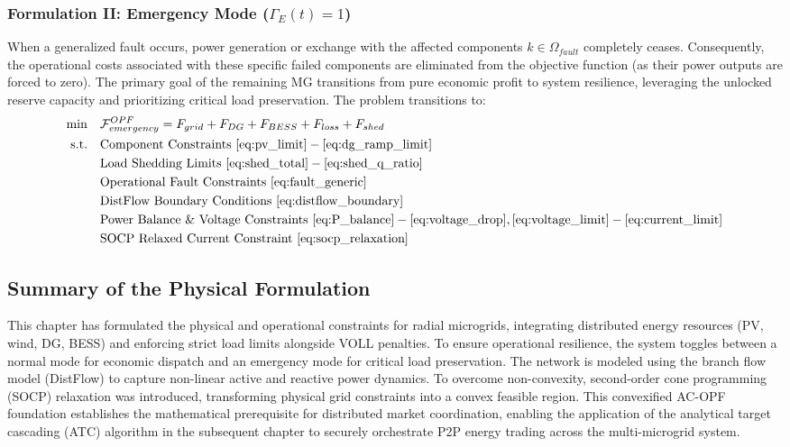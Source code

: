 \subsubsection{Formulation II: Emergency Mode ($\Gamma_E(t) = 1$)}
When a generalized fault occurs, power generation or exchange with the affected components $k \in \Omega_{fault}$ completely ceases. Consequently, the operational costs associated with these specific failed components are eliminated from the objective function (as their power outputs are forced to zero). The primary goal of the remaining MG transitions from pure economic profit to system resilience, leveraging the unlocked reserve capacity and prioritizing critical load preservation. The problem transitions to:
\begin{equation}
\begin{aligned}
    \min \quad & \mathcal{F}_{emergency}^{OPF} = F_{grid} + F_{DG} + F_{BESS} + F_{loss} + F_{shed} \\
    \text{s.t.} \quad & \text{Component Constraints } \eqref{eq:pv_limit}-\eqref{eq:dg_ramp_limit} \\
    & \text{Load Shedding Limits } \eqref{eq:shed_total}-\eqref{eq:shed_q_ratio} \\
    & \text{Operational Fault Constraints } \eqref{eq:fault_generic} \\
    & \text{DistFlow Boundary Conditions } \eqref{eq:distflow_boundary} \\
    & \text{Power Balance \& Voltage Constraints } \eqref{eq:P_balance}-\eqref{eq:voltage_drop}, \eqref{eq:voltage_limit}-\eqref{eq:current_limit} \\
    & \text{SOCP Relaxed Current Constraint } \eqref{eq:socp_relaxation}
\end{aligned}
\label{eq:total_objective_emergency}
\end{equation}

\subsection{Summary of the Physical Formulation}

This chapter has formulated the physical and operational constraints for radial microgrids, integrating distributed energy resources (PV, wind, DG, BESS) and enforcing strict load limits alongside VOLL penalties. To ensure operational resilience, the system toggles between a normal mode for economic dispatch and an emergency mode for critical load preservation. The network is modeled using the branch flow model (DistFlow) to capture non-linear active and reactive power dynamics. To overcome non-convexity, second-order cone programming (SOCP) relaxation was introduced, transforming physical grid constraints into a convex feasible region. This convexified AC-OPF foundation establishes the mathematical prerequisite for distributed market coordination, enabling the application of the analytical target cascading (ATC) algorithm in the subsequent chapter to securely orchestrate P2P energy trading across the multi-microgrid system.
